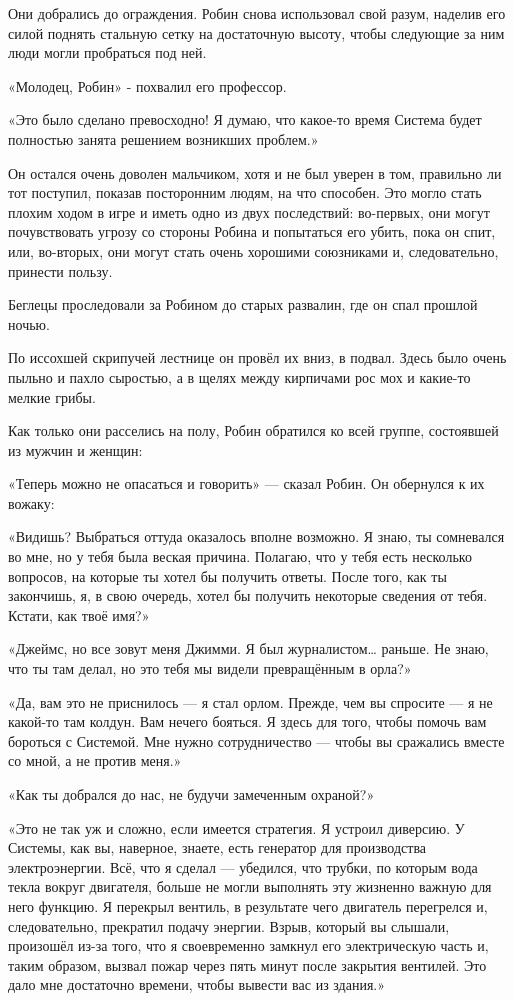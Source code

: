 \documentclass[a5paper, 9pt,
final, openany, twoside=true]{memoir}
\begin{document}
Они добрались до ограждения. Робин снова использовал свой разум, наделив его силой поднять стальную сетку на достаточную высоту, чтобы следующие за ним люди могли пробраться под ней.

«Молодец, Робин» - похвалил его профессор.

«Это было сделано превосходно! Я думаю, что какое-то время Система будет полностью занята решением возникших проблем.»

Он остался очень доволен мальчиком, хотя и не был уверен в том, правильно ли тот поступил, показав посторонним людям, на что способен. Это могло стать плохим ходом в игре и иметь одно из двух последствий: во-первых, они могут почувствовать угрозу со стороны Робина и попытаться его убить, пока он спит, или, во-вторых, они могут стать очень хорошими союзниками и, следовательно, принести пользу.

Беглецы проследовали за Робином до старых развалин, где он спал прошлой ночью.

По иссохшей скрипучей лестнице он провёл их вниз, в подвал. Здесь было очень пыльно и пахло сыростью, а в щелях между кирпичами рос мох и какие-то мелкие грибы.

Как только они расселись на полу, Робин обратился ко всей группе, состоявшей из мужчин и женщин:

«Теперь можно не опасаться и говорить» — сказал Робин. Он обернулся к их вожаку:

«Видишь? Выбраться оттуда оказалось вполне возможно. Я знаю, ты сомневался во мне, но у тебя была веская причина. Полагаю, что у тебя есть несколько вопросов, на которые ты хотел бы получить ответы. После того, как ты закончишь, я, в свою очередь, хотел бы получить некоторые сведения от тебя. Кстати, как твоё имя?»

«Джеймс, но все зовут меня Джимми. Я был журналистом… раньше. Не знаю, что ты там делал, но это тебя мы видели превращённым в орла?»

«Да, вам это не приснилось — я стал орлом. Прежде, чем вы спросите — я не какой-то там колдун. Вам нечего бояться. Я здесь для того, чтобы помочь вам бороться с Системой. Мне нужно сотрудничество — чтобы вы сражались вместе со мной, а не против меня.»

«Как ты добрался до нас, не будучи замеченным охраной?»

«Это не так уж и сложно, если имеется стратегия. Я устроил диверсию. У Системы, как вы, наверное, знаете, есть генератор для производства электроэнергии. Всё, что я сделал — убедился, что трубки, по которым вода текла вокруг двигателя, больше не могли выполнять эту жизненно важную для него функцию. Я перекрыл вентиль, в результате чего двигатель перегрелся и, следовательно, прекратил подачу энергии. Взрыв, который вы слышали, произошёл из-за того, что я своевременно замкнул его электрическую часть и, таким образом, вызвал пожар через пять минут после закрытия вентилей. Это дало мне достаточно времени, чтобы вывести вас из здания.»
\end{document}
